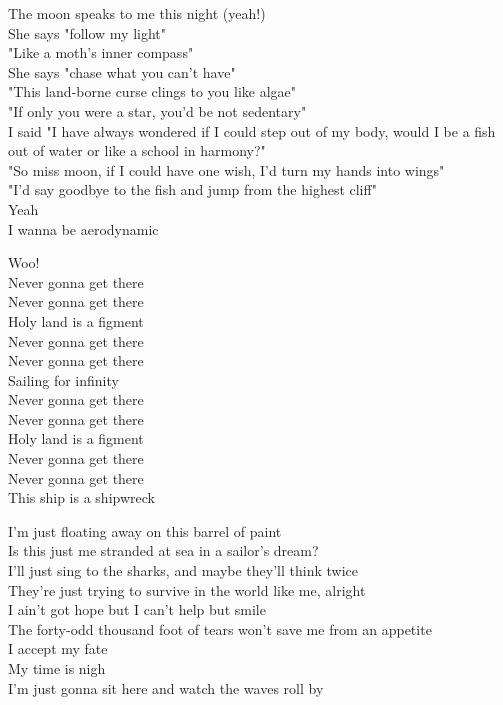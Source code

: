 
The moon speaks to me this night (yeah!) \\
She says "follow my light" \\
"Like a moth's inner compass" \\
She says "chase what you can't have" \\
"This land-borne curse clings to you like algae" \\
"If only you were a star, you'd be not sedentary" \\
I said "I have always wondered if I could step out of my body, would I be a fish out of water or like a school in harmony?" \\
"So miss moon, if I could have one wish, I'd turn my hands into wings" \\
"I'd say goodbye to the fish and jump from the highest cliff" \\

Yeah \\
I wanna be aerodynamic \\


Woo! \\
Never gonna get there \\
Never gonna get there \\
Holy land is a figment \\
Never gonna get there \\
Never gonna get there \\
Sailing for infinity \\
Never gonna get there \\
Never gonna get there \\
Holy land is a figment \\
Never gonna get there \\
Never gonna get there \\
This ship is a shipwreck \\


I'm just floating away on this barrel of paint \\
Is this just me stranded at sea in a sailor's dream? \\
I'll just sing to the sharks, and maybe they'll think twice \\
They're just trying to survive in the world like me, alright \\
I ain't got hope but I can't help but smile \\
The forty-odd thousand foot of tears won't save me from an appetite \\
I accept my fate \\
My time is nigh \\
I'm just gonna sit here and watch the waves roll by \\

